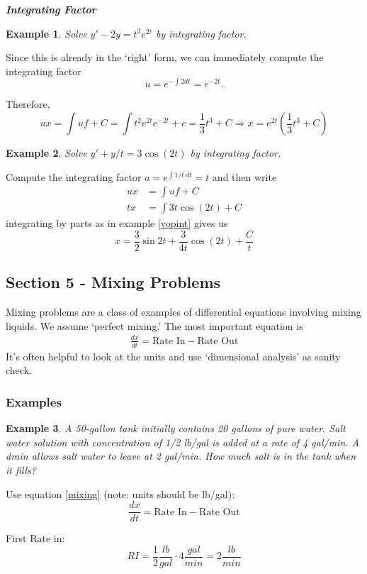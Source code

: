 \documentclass[14pt]{article}
\newtheorem{ex}{Example}
\newcommand{\type}[1]{\begin{center} \emph{\textbf{#1}} \end{center}}
\newcommand{\exs}{\subsubsection*{Examples}}
\begin{document}
\type{Integrating Factor}

\begin{ex} Solve $y' -2 y = t^2 e^{2 t  }$ by integrating factor.\end{ex}

Since this is already in the `right' form, we can immediately compute the integrating factor
\[u = e^{-\int2 dt } = e^{-2t}.\]

Therefore, 
\[ u x =\int uf + C  = \int t^2 e^{2t} e^{-2t} + c = \frac{1}{3} t^3 + C \Rightarrow x = e^{2t} \left( \frac{1}{3} t^3 + C \right)\]

\begin{ex}Solve  $y' + y / t = 3 \cos{(2t)}$ by integrating factor.\end{ex}

Compute the integrating factor $a = e^{\int 1/ t\ dt } = t$ and then write
\begin{align*} u x &= \int u f + C \\ t x &=  \int 3t \cos{(2t)} + C\end{align*} 
integrating by parts as in example \ref{vopint} gives us
\[x = \frac{3 }{2}  \sin 2t  + \frac{3}{4t }\cos{(2t)}+ \frac{C}{t}  \]



\subsection{Section 5 - Mixing Problems}

Mixing problems are a class of examples of differential equations involving mixing liquids. We assume `perfect mixing.' The most important equation is
\begin{align}\label{mixing} \frac{dx}{dt} = \mbox{Rate In} - \mbox{Rate Out} \end{align}
It's often helpful to look at the units and use `dimensional analysis' as sanity check.

\exs


\begin{ex}
A 50-gallon tank initially contains 20 gallons of pure water. Salt water solution with concentration of 1/2 lb/gal is added at a rate of 4 gal/min. A drain allows salt water to leave at 2 gal/min. How much salt is in the tank when it fills?
\end{ex}

Use equation \ref{mixing} (note: units should be lb/gal):
\[\frac{dx}{dt} = \mbox{Rate In} - \mbox{Rate Out}\]

First Rate in:
\[RI = \frac{1}{2} \frac{lb}{gal} \cdot 4 \frac{gal}{min} = 2 \frac{lb}{min}\]
\end{document}
